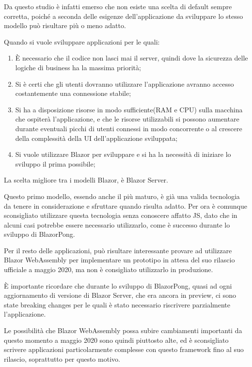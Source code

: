 Da questo studio \`e infatti emerso che non esiste una scelta di default sempre corretta, poich\'e a seconda delle esigenze dell'applicazione da sviluppare lo stesso modello pu\`o risultare pi\`u o meno adatto.

Quando si vuole sviluppare applicazioni per le quali:
\begin{enumerate}
	\item \`E necessario che il codice non lasci mai il server, quindi dove la sicurezza delle logiche di business ha la massima priorit\`a;
	\item Si \`e certi che gli utenti dovranno utilizzare l'applicazione avranno accesso costantemente una connessione stabile;
	\item Si ha a disposizione risorse in modo sufficiente(RAM e CPU) sulla macchina che ospiter\`a l'applicazione, e che le risorse utilizzabili si possono aumentare durante eventuali picchi di utenti connessi in modo concorrente o al crescere della complessit\`a della UI dell'applicazione sviluppata;
	\item Si vuole utilizzare Blazor per sviluppare e si ha la necessit\`a di iniziare lo sviluppo il prima possibile;
\end{enumerate}

La scelta migliore tra i modelli Blazor, \`e Blazor Server.

Questo primo modello, essendo anche il pi\`u maturo, \`e gi\`a una valida tecnologia da tenere in considerazione e sfruttare quando risulta adatto.
Per ora \`e comunque sconsigliato utilizzare questa tecnologia senza conoscere affatto JS, dato che in alcuni casi potrebbe essere necessario utilizzarlo, come \`e successo durante lo sviluppo di BlazorPong.

Per il resto delle applicazioni, pu\`o risultare interessante provare ad utilizzare Blazor WebAssembly per implementare un prototipo in attesa del suo rilascio ufficiale a maggio 2020, ma non \`e consigliato utilizzarlo in produzione.

\`E importante ricordare che durante lo sviluppo di BlazorPong, quasi ad ogni aggiornamento di versione di Blazor Server, che era ancora in preview, ci sono state breaking changes per le quali \`e stato necessario riscrivere parzialmente l'applicazione.

Le possibilit\`a che Blazor WebAssembly possa subire cambiamenti importanti da questo momento a maggio 2020 sono quindi piuttosto alte, ed \`e sconsigliato scrivere applicazioni particolarmente complesse con questo framework fino al suo rilascio, soprattutto per questo motivo.

